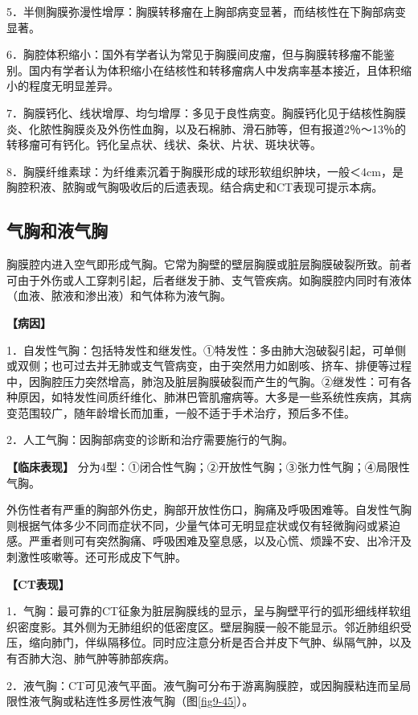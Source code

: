5．半侧胸膜弥漫性增厚：胸膜转移瘤在上胸部病变显著，而结核性在下胸部病变显著。

6．胸腔体积缩小：国外有学者认为常见于胸膜间皮瘤，但与胸膜转移瘤不能鉴别。国内有学者认为体积缩小在结核性和转移瘤病人中发病率基本接近，且体积缩小的程度无明显差异。

7．胸膜钙化、线状增厚、均匀增厚：多见于良性病变。胸膜钙化见于结核性胸膜炎、化脓性胸膜炎及外伤性血胸，以及石棉肺、滑石肺等，但有报道2％～13％的转移瘤可有钙化。钙化呈点状、线状、条状、片状、斑块状等。

8．胸膜纤维素球：为纤维素沉着于胸膜形成的球形软组织肿块，一般＜4cm，是胸腔积液、脓胸或气胸吸收后的后遗表现。结合病史和CT表现可提示本病。

\subsection{气胸和液气胸}

胸膜腔内进入空气即形成气胸。它常为胸壁的壁层胸膜或脏层胸膜破裂所致。前者可由于外伤或人工穿刺引起，后者继发于肺、支气管疾病。如胸膜腔内同时有液体（血液、脓液和渗出液）和气体称为液气胸。

\textbf{【病因】}

1．自发性气胸：包括特发性和继发性。①特发性：多由肺大泡破裂引起，可单侧或双侧；也可过去并无肺或支气管病变，由于突然用力如剧咳、挤车、排便等过程中，因胸腔压力突然增高，肺泡及脏层胸膜破裂而产生的气胸。②继发性：可有各种原因，如特发性间质纤维化、肺淋巴管肌瘤病等。大多是一些系统性疾病，其病变范围较广，随年龄增长而加重，一般不适于手术治疗，预后多不佳。

2．人工气胸：因胸部病变的诊断和治疗需要施行的气胸。

\textbf{【临床表现】}
分为4型：①闭合性气胸；②开放性气胸；③张力性气胸；④局限性气胸。

外伤性者有严重的胸部外伤史，胸部开放性伤口，胸痛及呼吸困难等。自发性气胸则根据气体多少不同而症状不同，少量气体可无明显症状或仅有轻微胸闷或紧迫感。严重者则可有突然胸痛、呼吸困难及窒息感，以及心慌、烦躁不安、出冷汗及刺激性咳嗽等。还可形成皮下气肿。

\textbf{【CT表现】}

1．气胸：最可靠的CT征象为脏层胸膜线的显示，呈与胸壁平行的弧形细线样软组织密度影。其外侧为无肺组织的低密度区。壁层胸膜一般不能显示。邻近肺组织受压，缩向肺门，伴纵隔移位。同时应注意分析是否合并皮下气肿、纵隔气肿，以及有否肺大泡、肺气肿等肺部疾病。

2．液气胸：CT可见液气平面。液气胸可分布于游离胸膜腔，或因胸膜粘连而呈局限性液气胸或粘连性多房性液气胸（图\ref{fig9-45}）。

